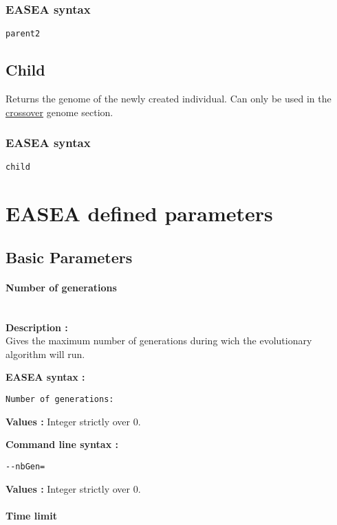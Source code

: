 \documentclass{book}
\begin{document}
\subsubsection{EASEA syntax}\label{easea-syntax-12}

\texttt{parent2}

\subsection{Child}\label{child}

Returns the genome of the newly created individual. Can only be used in
the \href{EASEA defined sections\#Genome_Crossover}{crossover} genome
section.

\subsubsection{EASEA syntax}\label{easea-syntax-13}

\texttt{child}


\section{EASEA defined parameters}
\subsection{Basic Parameters}\label{basic-parameters}

\paragraph{Number of generations}\label{number-of-generations}
~\\

\textbf{Description :}\\Gives the maximum number of generations during
wich the evolutionary algorithm will run.

\textbf{EASEA syntax :}

\texttt{Number~of~generations:}

\textbf{Values :} Integer strictly over 0.

\textbf{Command line syntax :}

\texttt{-{}-nbGen=}

\textbf{Values :} Integer strictly over 0.

\paragraph{Time limit}\label{time-limit}
~\\
\end{document}
